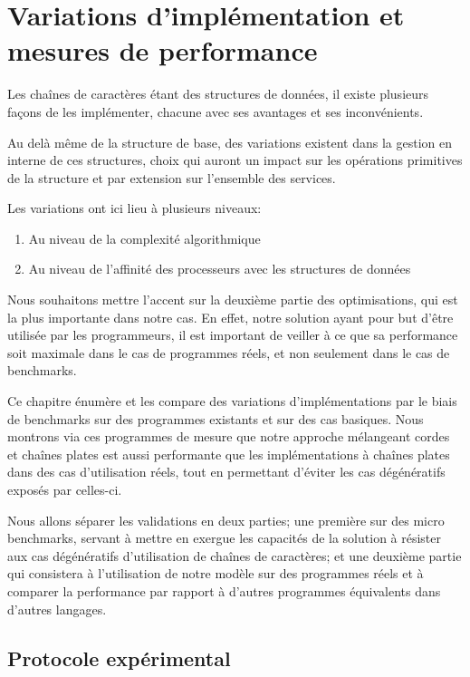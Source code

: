 \chapter{Variations d'implémentation et mesures de performance}\label{perf_chap}

Les chaînes de caractères étant des structures de données, il existe
plusieurs façons de les implémenter, chacune avec ses avantages
et ses inconvénients.

Au delà même de la structure de base, des variations existent dans
la gestion en interne de ces structures, choix qui auront un impact
sur les opérations primitives de la structure et par extension sur
l'ensemble des services.

Les variations ont ici lieu à plusieurs niveaux:

\begin{enumerate}
	\item Au niveau de la complexité algorithmique
	\item Au niveau de l'affinité des processeurs avec les structures de données
\end{enumerate}

Nous souhaitons mettre l'accent sur la deuxième partie des optimisations,
qui est la plus importante dans notre cas.
En effet, notre solution ayant pour but d'être utilisée par les programmeurs,
il est important de veiller à ce que sa performance soit maximale dans le
cas de programmes réels, et non seulement dans le cas de benchmarks.

Ce chapitre énumère et les compare des variations d'implémentations par le biais
de benchmarks sur des programmes existants et sur des cas basiques.
Nous montrons via ces programmes de mesure que notre
approche mélangeant cordes et chaînes plates est aussi performante que les
implémentations à chaînes plates dans des cas d'utilisation réels, tout en
permettant d'éviter les cas dégénératifs exposés par celles-ci.

Nous allons séparer les validations en deux parties; une première sur
des micro benchmarks, servant à mettre en exergue les capacités de la
solution à résister aux cas dégénératifs d'utilisation de chaînes de
caractères; et une deuxième partie qui consistera à l'utilisation de
notre modèle sur des programmes réels et à comparer la performance par
rapport à d'autres programmes équivalents dans d'autres langages.

\section{Protocole expérimental}

